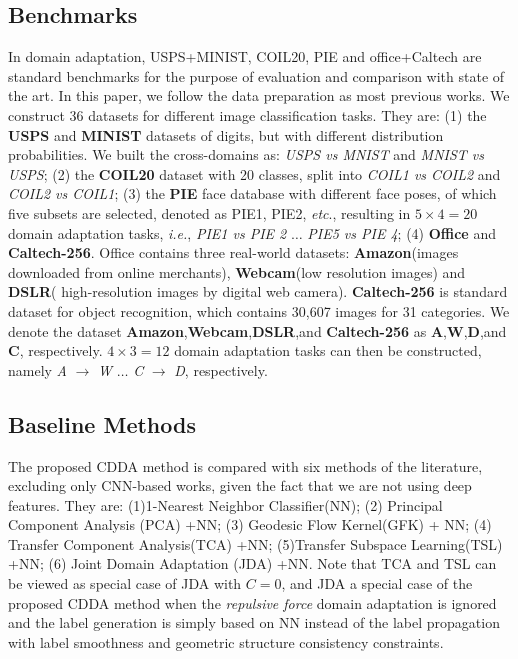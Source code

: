 \documentclass[10pt,twocolumn,letterpaper]{article}
\begin{document}
\begin{CJK*}{UTF8}{gkai}
\subsection{Benchmarks}
In domain adaptation, USPS+MINIST, COIL20, PIE and office+Caltech are standard benchmarks for the purpose of evaluation and comparison with state of the art. In this paper, we follow the data preparation as most previous works. We construct 36 datasets for different image classification tasks. They are: (1) the \textbf{USPS} and \textbf{MINIST} datasets of digits, but with different distribution probabilities. We built the cross-domains as: \emph{USPS vs MNIST} and \emph{MNIST vs USPS}; (2) the \textbf{COIL20} dataset with 20 classes, split into \emph{ COIL1 vs COIL2} and \emph{COIL2 vs COIL1}; (3) the  \textbf{PIE} face database with different face {poses}, of which five subsets are selected, denoted as PIE1, PIE2, \textit{etc}., resulting in $5 \times 4=20$ domain adaptation tasks, \textit{i.e.}, \emph{PIE1 vs PIE 2} $\dots$ \emph{PIE5 vs PIE 4}; (4) \textbf{Office} and \textbf{Caltech-256}. Office contains three real-world datasets: \textbf{Amazon}(images downloaded from online merchants), \textbf{Webcam}(low resolution images) and \textbf{DSLR}( high-resolution images by digital web camera). \textbf{Caltech-256} is standard dataset for object recognition, which contains 30,607 images for 31 categories. We denote the dataset \textbf{Amazon},\textbf{Webcam},\textbf{DSLR},and \textbf{Caltech-256} as \textbf{A},\textbf{W},\textbf{D},and \textbf{C}, respectively.  $4\times 3=12$ domain adaptation tasks can then be constructed, namely \emph{A} $\rightarrow$ \emph{W} $\dots$ \emph{C} $\rightarrow$ \emph{D}, respectively.



\subsection{Baseline Methods}
The proposed CDDA method is compared with six methods of the literature, excluding only CNN-based works, given the fact that we are not using deep features. They are: (1)1-Nearest Neighbor Classifier(NN); (2) Principal Component Analysis (PCA) +NN; (3) Geodesic Flow Kernel(GFK) \cite{gong2012geodesic} + NN; (4) Transfer Component Analysis(TCA) \cite{pan2011domain} +NN; (5)Transfer Subspace Learning(TSL) \cite{4967588} +NN; (6) Joint Domain Adaptation (JDA) \cite{long2013transfer} +NN. Note that TCA and TSL can be viewed as special case of JDA with $C=0$, and JDA a special case of the proposed CDDA method when the \textit{repulsive force} domain adaptation is ignored and the label generation is simply based on NN instead of the label propagation with label smoothness and geometric structure consistency constraints.  


\end{CJK*}
\end{document}
